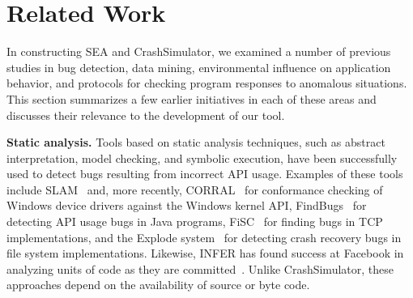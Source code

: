 \section{Related Work}
\label{SEC:related-work}

In constructing SEA and CrashSimulator, we examined a number of previous
studies in bug detection, data mining, environmental influence on
application behavior, and protocols for checking program responses to anomalous
situations. This section
summarizes a few earlier initiatives in each of these areas and discusses
their relevance to the development of our tool.



\iffalse
While there is a vast amount of literature on test
generation~\cite{ammann2008introduction, mcminn2004search,
  puasuareanu2009survey, dias2007survey}, much less work
has focused on issues of portability, and tests of whether software
behaves consistently in different environments.  Prior work on
CheckAPI~\cite{rasley2015detecting} and
NetCheck~\cite{Zhuang_NSDI_2014} begins to fill this gap and this paper
builds upon those results.
%
%


Crash reproduction by test case mutation~\cite{DBLP:conf/sigsoft/XuanXM15}.

\fi


\noindent
{\bf Static analysis. }
\label{rel-static-analysis}
Tools based on static analysis techniques, such as abstract interpretation,
model checking, and symbolic execution, have been successfully
used to
detect bugs resulting from incorrect API usage. Examples of these tools
include
SLAM~\cite{Ball_adecade, Ball:2002:SLP:503272.503274} and, more recently,
CORRAL~\cite{DBLP:conf/sigsoft/LalQ14} for conformance checking of Windows
device drivers against the Windows kernel API,
FindBugs~\cite{DBLP:conf/oopsla/HovemeyerP04} for detecting API usage bugs
in Java programs, FiSC~\cite{Musuvathi04modelchecking} for finding bugs in
TCP implementations, and the Explode
system~\cite{Yang:2006:ELG:1298455.1298469} for detecting crash recovery
bugs in file system implementations.  Likewise, INFER has found success at
Facebook in analyzing units of code as they are
committed~\cite{INFERFacebook}. Unlike CrashSimulator, these
approaches depend on the availability of source or byte code.

